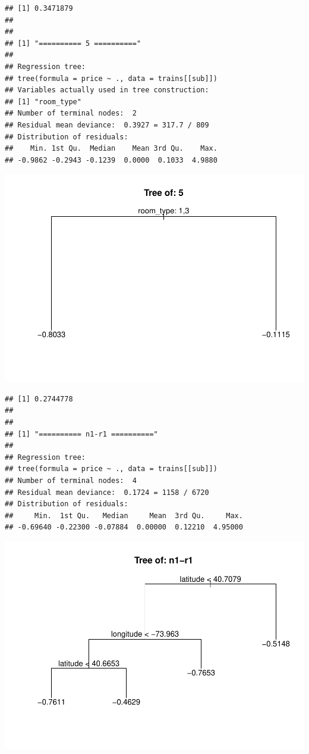 \documentclass[
]{article}
\begin{document}
\begin{verbatim}
## [1] 0.3471879
## 
## 
## [1] "========== 5 =========="
## 
## Regression tree:
## tree(formula = price ~ ., data = trains[[sub]])
## Variables actually used in tree construction:
## [1] "room_type"
## Number of terminal nodes:  2 
## Residual mean deviance:  0.3927 = 317.7 / 809 
## Distribution of residuals:
##    Min. 1st Qu.  Median    Mean 3rd Qu.    Max. 
## -0.9862 -0.2943 -0.1239  0.0000  0.1033  4.9880
\end{verbatim}

\includegraphics{project-code_files/figure-latex/unnamed-chunk-14-5.pdf}

\begin{verbatim}
## [1] 0.2744778
## 
## 
## [1] "========== n1-r1 =========="
## 
## Regression tree:
## tree(formula = price ~ ., data = trains[[sub]])
## Number of terminal nodes:  4 
## Residual mean deviance:  0.1724 = 1158 / 6720 
## Distribution of residuals:
##     Min.  1st Qu.   Median     Mean  3rd Qu.     Max. 
## -0.69640 -0.22300 -0.07884  0.00000  0.12210  4.95000
\end{verbatim}

\includegraphics{project-code_files/figure-latex/unnamed-chunk-14-6.pdf}
\end{document}
